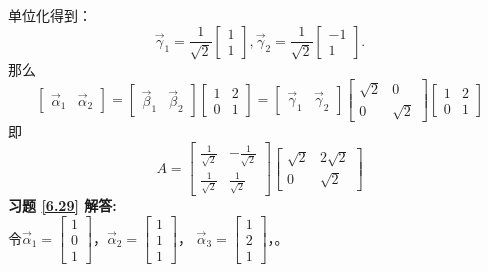 \documentclass[a4paper]{book}
\begin{document}
单位化得到：
\begin{equation*}
\vec{\gamma}_1=\frac{1}{\sqrt{2}}\begin{bmatrix}1\\1\end{bmatrix},
\vec{\gamma}_2=\frac{1}{\sqrt{2}}\begin{bmatrix}-1\\1\end{bmatrix}.
\end{equation*}
那么
\begin{equation*}
\begin{bmatrix}\vec{\alpha}_1&\vec{\alpha}_2\end{bmatrix}=
\begin{bmatrix}\vec{\beta}_1&\vec{\beta}_2\end{bmatrix}\begin{bmatrix}1&2\\0&1\end{bmatrix}
=\begin{bmatrix}\vec{\gamma}_1&\vec{\gamma}_2\end{bmatrix}\begin{bmatrix}\sqrt{2}&0\\0&\sqrt{2}\end{bmatrix}
\begin{bmatrix}1&2\\0&1\end{bmatrix}
\end{equation*}
即
\begin{equation*}
A=\begin{bmatrix}\frac{1}{\sqrt{2}}&-\frac{1}{\sqrt{2}}\\ \frac{1}{\sqrt{2}}&\frac{1}{\sqrt{2}}\end{bmatrix}
  \begin{bmatrix}\sqrt{2}&2\sqrt{2}\\0&\sqrt{2}\end{bmatrix}
\end{equation*}
\textbf{习题 \ref{6.29} 解答:}\\
令$\vec{\alpha}_1=\begin{bmatrix}1\\0\\1\end{bmatrix}$，$\vec{\alpha}_2=\begin{bmatrix}1\\1\\1\end{bmatrix}$，
$\vec{\alpha}_3=\begin{bmatrix}1\\2\\1\end{bmatrix}$，。
\end{document}
